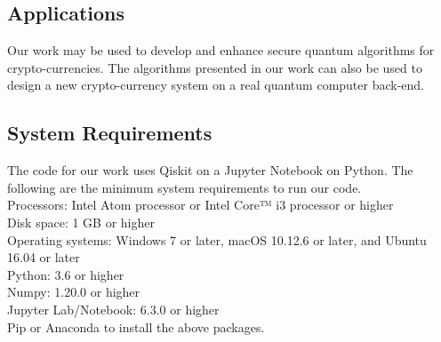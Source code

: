\subsection{Applications}
Our work may be used to develop and enhance secure quantum algorithms for crypto-currencies. The algorithms presented in our work can also be used to design a new crypto-currency system on a real quantum computer back-end.
\subsection{System Requirements}
The code for our work uses Qiskit on a Jupyter Notebook on Python. The following are the minimum system requirements to run our code.\\
Processors: Intel Atom processor or Intel Core™ i3 processor or higher\\
Disk space: 1 GB or higher\\
Operating systems: Windows 7 or later, macOS 10.12.6 or later, and Ubuntu 16.04 or later\\
Python: 3.6 or higher\\
Numpy: 1.20.0 or higher\\
Jupyter Lab/Notebook: 6.3.0 or higher\\
Pip or Anaconda to install the above packages.\\
